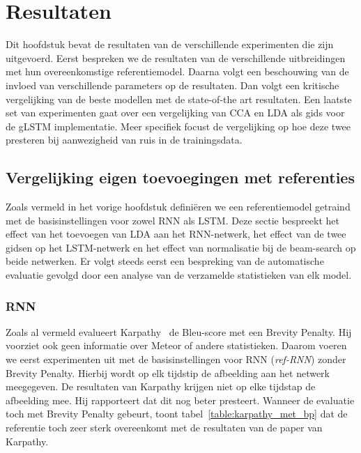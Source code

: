 \chapter{Resultaten} %
\label{cha:resultaten}
Dit hoofdstuk bevat de resultaten van de verschillende experimenten die zijn uitgevoerd. Eerst bespreken we de resultaten van de verschillende uitbreidingen met hun overeenkomstige referentiemodel. Daarna volgt een beschouwing van de invloed van verschillende parameters op de resultaten. Dan volgt een kritische vergelijking van de beste modellen met de state-of-the art resultaten. Een laatste set van experimenten gaat over een vergelijking van CCA en LDA als gids voor de gLSTM implementatie. Meer specifiek focust  de vergelijking op hoe deze twee presteren bij aanwezigheid van ruis in de trainingsdata.

\section{Vergelijking eigen toevoegingen met referenties}  %
\label{sec:eigen_implementaties}
Zoals vermeld in het vorige hoofdstuk defini\"eren we een referentiemodel getraind met de basisinstellingen voor zowel RNN als LSTM. Deze sectie bespreekt het effect van het toevoegen van LDA aan het RNN-netwerk, het effect van de twee gidsen op het LSTM-netwerk en het effect van normalisatie bij de beam-search op beide netwerken. Er volgt steeds eerst een bespreking van de automatische evaluatie gevolgd door een analyse van de verzamelde statistieken van elk model.

\subsection{RNN}
Zoals al vermeld evalueert Karpathy~\cite{Karpathy2015} de Bleu-score met een Brevity Penalty. Hij voorziet ook geen informatie over Meteor of andere statistieken. Daarom voeren we eerst experimenten uit met de basisinstellingen voor RNN (\emph{ref-RNN}) zonder Brevity Penalty. Hierbij wordt op elk tijdstip de afbeelding aan het netwerk meegegeven. De resultaten van Karpathy krijgen niet op elke tijdstap de afbeelding mee. Hij rapporteert dat dit nog beter presteert. Wanneer de evaluatie toch met Brevity Penalty gebeurt, toont tabel~\ref{table:karpathy_met_bp} dat de referentie toch zeer sterk overeenkomt met de resultaten van de paper van Karpathy. 

